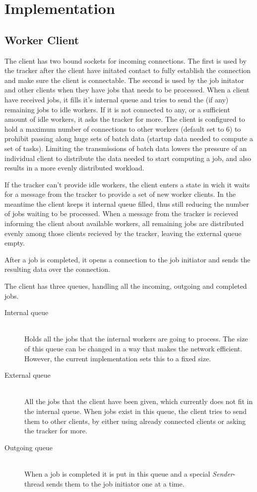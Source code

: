 \chapter{Implementation}


\section{Worker Client}
The client has two bound sockets for incoming connections. The first is used by the tracker after the client have initated contact to fully establish the connection and make sure the client is connectable.
The second is used by the job initator and other clients when they have jobs that needs to be processed.
When a client have received jobs, it fills it's internal queue and tries to send the (if any) remaining jobs to idle workers.
If it is not connected to any, or a sufficient amount of idle workers, it asks the tracker for more. The client is configured to hold a maximum number of connections to other workers (default set to 6) to prohibit passing along huge sets of batch data (startup data needed to compute a set of tasks). Limiting the transmissions of batch data lowers the pressure of an individual client to distribute the data needed to start computing a job, and also results in a more evenly distributed workload.

If the tracker can't provide idle workers, the client enters a state in wich it waits for a message from the tracker to provide a set of new worker clients. In the meantime the client keeps it internal queue filled, thus still reducing the number of jobs waiting to be processed. When a message from the tracker is recieved informing the client about available workers, all remaining jobs are distributed evenly among those clients recieved by the tracker, leaving the external queue empty.

After a job is completed, it opens a connection to the job initiator and sends the resulting data over the connection.

The client has three queues, handling all the incoming, outgoing and completed jobs.
\begin{description}
	\item[Internal queue] \hfill \\
	Holds all the jobs that the internal workers are going to process. The size of this queue can be changed in a way that makes the network efficient. However, the current implementation sets this to a fixed size.
	\item[External queue] \hfill \\
	All the jobs that the client have been given, which currently does not fit in the internal queue.
	When jobs exist in this queue, the client tries to send them to other clients, by either using already connected clients or asking the tracker for more.
	\item[Outgoing queue] \hfill \\
	When a job is completed it is put in this queue and a special \textit{Sender}-thread sends them to the job initiator one at a time.
\end{description}

